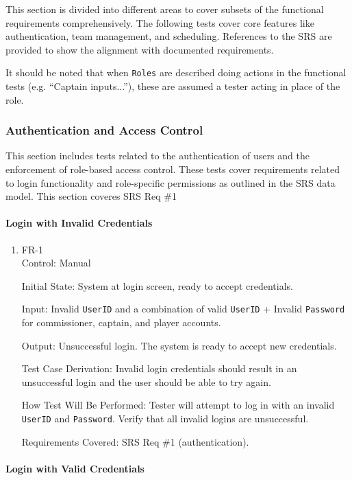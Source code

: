 \documentclass[12pt, titlepage]{article}
\begin{document}
This section is divided into different areas to cover subsets of the functional requirements comprehensively. The following tests cover core features like authentication, team management, and scheduling. References to the SRS are provided to show the alignment with documented requirements.

It should be noted that when \texttt{Roles} are described doing actions in the functional tests (e.g. ``Captain inputs...''), these are assumed a tester acting in place of the role. 

\subsubsection{Authentication and Access Control}

This section includes tests related to the authentication of users and the enforcement of role-based access control. These tests cover requirements related to login functionality and role-specific permissions as outlined in the SRS data model. This section coveres SRS Req \#1

\paragraph{Login with Invalid Credentials}

\begin{enumerate}
\item{FR-1\\}
Control: Manual

Initial State: System at login screen, ready to accept credentials.

Input: Invalid \texttt{UserID} and a combination of valid \texttt{UserID} + Invalid \texttt{Password} for commissioner, captain, and player accounts.

Output: Unsuccessful login. The system is ready to accept new credentials.

Test Case Derivation: Invalid login credentials should result in an unsuccessful login and the user should be able to try again.

How Test Will Be Performed: Tester will attempt to log in with an invalid \texttt{UserID} and \texttt{Password}. Verify that all invalid logins are unsuccessful.

Requirements Covered: SRS Req \#1 (authentication).
\end{enumerate}

\paragraph{Login with Valid Credentials}
\end{document}
